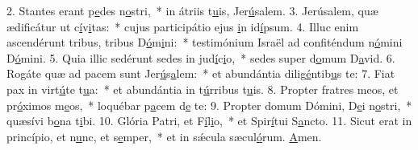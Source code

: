 2. Stantes erant p\uline{e}des n\uline{o}stri,~* in átriis t\uline{u}is, Jer\uline{ú}salem.
3. Jerúsalem, quæ ædificátur ut c\uline{í}v\uline{i}tas:~* cujus participátio ejus \uline{i}n id\uline{í}psum.
4. Illuc enim ascendérunt tribus, tribus D\uline{ó}m\uline{i}ni:~* testimónium Israël ad confiténdum n\uline{ó}mini D\uline{ó}mini.
5. Quia illic sedérunt sedes in jud\uline{í}c\uline{i}o,~* sedes super d\uline{o}mum D\uline{a}vid.
6. Rogáte quæ ad pacem sunt Jer\uline{ú}s\uline{a}lem:~* et abundántia dilig\uline{é}ntib\uline{u}s te:
7. Fiat pax in virt\uline{ú}te t\uline{u}a:~* et abundántia in t\uline{ú}rribus t\uline{u}is.
8. Propter fratres meos, et pr\uline{ó}ximos m\uline{e}os,~* loquébar p\uline{a}cem d\uline{e} te:
9. Propter domum Dómini, D\uline{e}i n\uline{o}stri,~* quæsívi b\uline{o}na t\uline{i}bi.
10. Glória Patri, et F\uline{í}l\uline{i}o,~* et Spir\uline{í}tui S\uline{a}ncto.
11. Sicut erat in princípio, et n\uline{u}nc, et s\uline{e}mper,~* et in sǽcula sæcul\uline{ó}rum. \uline{A}men.
